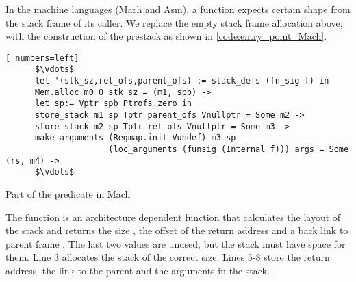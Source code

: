 In the machine languages (Mach and Asm), a function expects certain shape from the stack frame of its caller. We replace the empty stack frame allocation above, with the construction of the prestack as shown in \autoref{code:entry_point_Mach}.
\begin{table}
\begin{lstlisting}[ numbers=left]
      $\vdots$
      let '(stk_sz,ret_ofs,parent_ofs) := stack_defs (fn_sig f) in
      Mem.alloc m0 0 stk_sz = (m1, spb) ->
      let sp:= Vptr spb Ptrofs.zero in
      store_stack m1 sp Tptr parent_ofs Vnullptr = Some m2 ->
      store_stack m2 sp Tptr ret_ofs Vnullptr = Some m3 ->
      make_arguments (Regmap.init Vundef) m3 sp
                     (loc_arguments (funsig (Internal f))) args = Some (rs, m4) ->
      $\vdots$
\end{lstlisting}
\caption{Part of the  predicate in Mach}\label{code:entry_point_Mach}
\end{table}
The function  is an architecture dependent function that calculates the layout of the stack and returns the size , the offset of the return address  and a back link to parent frame . The last two values are unused, but the stack must have space for them. Line 3 allocates the stack of the correct size. Lines 5-8 store the return address, the link to the parent and the arguments in the stack. 




















